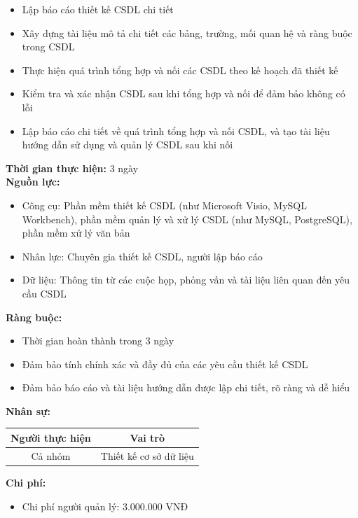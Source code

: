{\begin{minipage}{\textwidth}
\begin{itemize}
        \item Lập báo cáo thiết kế CSDL chi tiết
        \item Xây dựng tài liệu mô tả chi tiết các bảng, trường, mối quan hệ và ràng buộc trong CSDL
        \item Thực hiện quá trình tổng hợp và nối các CSDL theo kế hoạch đã thiết kế
        \item Kiểm tra và xác nhận CSDL sau khi tổng hợp và nối để đảm bảo không có lỗi
        \item Lập báo cáo chi tiết về quá trình tổng hợp và nối CSDL, và tạo tài liệu hướng dẫn sử dụng và quản lý CSDL sau khi nối
    \end{itemize}
    \vspace{0.5cm}
    \noindent \textbf{Thời gian thực hiện:} 3 ngày \\
    \noindent \textbf{Nguồn lực:}
    \begin{itemize}
        \item Công cụ: Phần mềm thiết kế CSDL (như Microsoft Visio, MySQL Workbench), phần mềm quản lý và xử lý CSDL (như MySQL, PostgreSQL), phần mềm xử lý văn bản
        \item Nhân lực: Chuyên gia thiết kế CSDL, người lập báo cáo
        \item Dữ liệu: Thông tin từ các cuộc họp, phỏng vấn và tài liệu liên quan đến yêu cầu CSDL
    \end{itemize}
    \vspace{0.5cm}
    \noindent \textbf{Ràng buộc:}
    \begin{itemize}
        \item Thời gian hoàn thành trong 3 ngày
        \item Đảm bảo tính chính xác và đầy đủ của các yêu cầu thiết kế CSDL
        \item Đảm bảo báo cáo và tài liệu hướng dẫn được lập chi tiết, rõ ràng và dễ hiểu
    \end{itemize}
    \vspace{0.5cm}
    \noindent \textbf{Nhân sự:}
    \begin{longtable}{|c|c|}
    \hline
    \textbf{Người thực hiện} & \textbf{Vai trò} \\
    \hline
    Cả nhóm & Thiết kế cơ sở dữ liệu \\
    \hline
    \end{longtable}
    \vspace{0.5cm}
    \noindent \textbf{Chi phí:}
    \begin{itemize}
        \item Chi phí người quản lý: 3.000.000 VNĐ

\end{itemize}
\end{minipage}}
